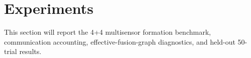 \section{Experiments}
\label{sec:experiments}

This section will report the 4+4 multisensor formation benchmark, communication accounting, effective-fusion-graph diagnostics, and held-out 50-trial results.
